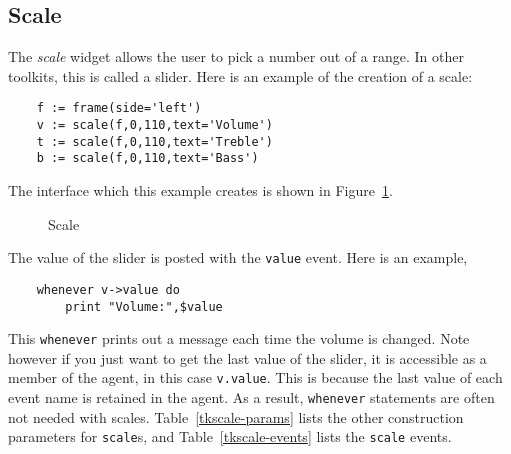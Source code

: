 \subsection{Scale}
The {\em scale} widget allows the user to pick a number out of a range. In other toolkits,
this is called a slider. Here is an example of the creation of a scale:
\begin{verbatim}
    f := frame(side='left')
    v := scale(f,0,110,text='Volume')
    t := scale(f,0,110,text='Treble')
    b := scale(f,0,110,text='Bass')
\end{verbatim}
The interface which this example creates is shown in Figure~\ref{tkscale}.
\begin{figure}[thb]
\centerline{}
\caption{ Scale }
\label{tkscale}
\end{figure}
The value of the slider is posted with the {\tt value} event. Here is an example,
\begin{verbatim}
    whenever v->value do
        print "Volume:",$value
\end{verbatim}
This {\tt whenever} prints out a message each time the volume is changed. Note
however if you just want to get the last value of the slider, it is accessible as
a member of the agent, in this case \verb+v.value+. This is because the last
value of each event name is retained in the agent. As a result, {\tt whenever}
statements are often not needed with scales. Table~\ref{tkscale-params} lists the
other construction parameters for {\tt scale}s, and Table~\ref{tkscale-events} lists
the {\tt scale} events.

